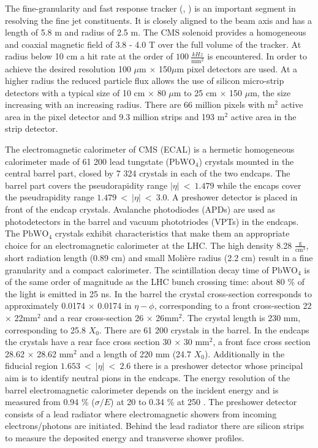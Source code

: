 The fine-granularity and fast response tracker (\cite{Karimaki:368412}, \cite{tracker_addendum}) is an important segment in resolving the fine jet constituents. It is closely aligned to the beam axis and has a length of 5.8 m and radius of 2.5 m. The CMS solenoid provides a homogeneous and coaxial magnetic field of 3.8 - 4.0 T over the full volume of the tracker. At radius below 10 cm a hit rate at the order of $100\ \frac{kHz}{\text{mm}^2}$ is encountered. In order to achieve the desired resolution 100 $\mu$m $\times$ 150$\mu$m pixel detectors are used. At a higher radius the reduced particle flux allows the use of silicon micro-strip detectors with a typical size of 10 cm $\times$ 80 $\mu\text{m}$ to 25 cm $\times$ 150 $\mu$m, the size increasing with an increasing radius. There are 66 million pixels with $\text{m}^{2}$ active area in the pixel detector and 9.3 million strips and 193 ${\text{m}}^2$ active area in the strip detector.

The electromagnetic calorimeter of CMS (ECAL) is a hermetic homogeneous calorimeter made of 61 200 lead tungstate ($\text{PbWO}_{4}$) crystals mounted in the central barrel part, closed by 7 324 crystals in each of the two endcaps. The barrel part covers the pseudorapidity range $\left|\eta\right|\ <\ 1.479$ while the encaps cover the pseudrapidity range $1.479\ <\ \left|\eta\right|\ <\ 3.0$. A preshower detector is placed in front of the endcap crystals. Avalanche photodiodes (APDs) are used as photodetectors in the barrel and vacuum phototriodes (VPTs) in the endcaps. The $\text{PbWO}_{4}$ crystals exhibit characteristics that make them an appropriate choice for an electromagnetic calorimeter at the LHC. The high density 8.28 $\frac{\text{g}}{\text{cm}^3}$, short radiation length (0.89 cm)  and small Molière radius (2.2 cm) result in a fine granularity and a compact calorimeter. The scintillation decay time of $\text{PbWO}_{4}$ is of the same order of magnitude as the LHC bunch crossing time: about 80 \% of the light is emitted in 25 ns. In the barrel the crystal cross-section corresponds to approximately 0.0174 $\times$ 0.0174 in $\eta - \phi$, corresponding to a front cross-section 22 $\times$ 22$\text{mm}^2$ and a rear cross-section 26 $\times$ 26$\text{mm}^2$. The crystal length is 230 mm, corresponding to 25.8 $X_{0}$. There are 61 200 crystals in the barrel. In the endcaps the crystals have a rear face cross section 30 $\times$ 30 $\text{mm}^2$, a front face cross section 28.62 $\times$ 28.62 $\text{mm}^2$ and a length of 220 mm (24.7 $X_{0}$). Additionally in the fiducial region $1.653\ <\ \left|\eta\right|\ <\ 2.6$ there is a preshower detector whose principal aim is to identify neutral pions in the endcaps. The energy resolution of the barrel electromagnetic calorimeter depends on the incident energy and is measured from 0.94 \% ($\sigma/E$) at 20 \GeV to 0.34 \% at 250 \GeV \cite{Adzic:2007mi}. The preshower detector consists of a lead radiator where electromagnetic showers from incoming electrons/photons are initiated. Behind the lead radiator there are silicon strips to measure the deposited energy and transverse shower profiles.

